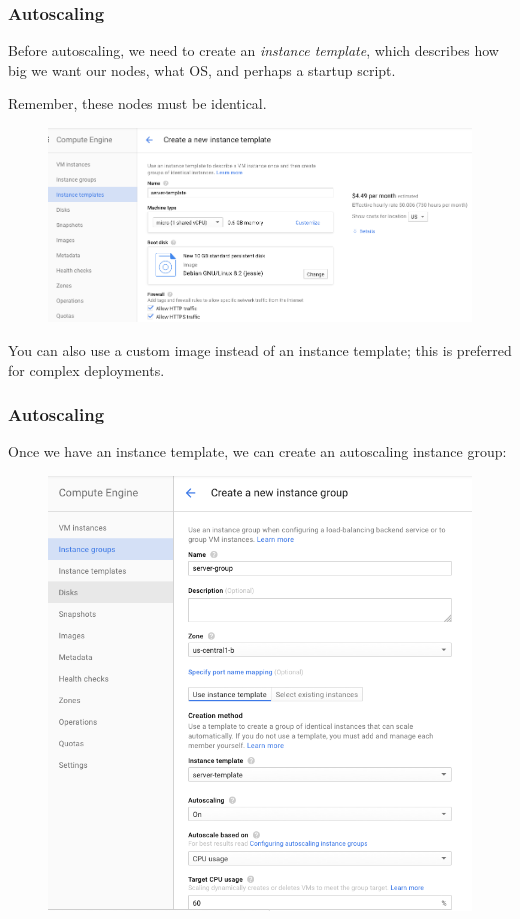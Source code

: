 \documentclass[9pt]{beamer}
\begin{document}
\begin{frame}[fragile]
  \frametitle{Autoscaling}
  Before autoscaling, we need to create an \emph{instance template}, which describes how big we want our nodes, what OS, and perhaps a startup script.
  
  Remember, these nodes must be identical.
  \begin{figure}
    \includegraphics[scale=0.3]{figures/InstanceTemplate.png}
  \end{figure}
  You can also use a custom image instead of an instance template; this is preferred for complex deployments.
\end{frame}

\begin{frame}[fragile]
  \frametitle{Autoscaling}
  Once we have an instance template, we can create an autoscaling instance group:
  \begin{figure}
    \includegraphics[scale=0.2]{figures/Autoscale.png}
  \end{figure}
\end{frame}
\end{document}
